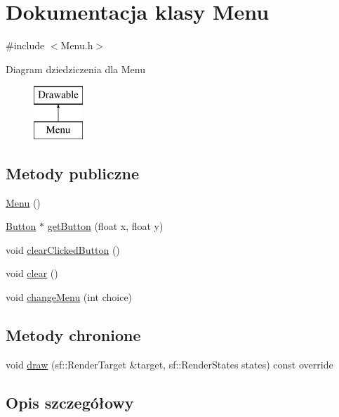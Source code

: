\hypertarget{class_menu}{}\section{Dokumentacja klasy Menu}
\label{class_menu}


{\ttfamily \#include $<$Menu.\+h$>$}

Diagram dziedziczenia dla Menu\begin{figure}[H]
\begin{center}
\leavevmode
\includegraphics[height=2.000000cm]{class_menu}
\end{center}
\end{figure}
\subsection*{Metody publiczne}
\begin{DoxyCompactItemize}
\item 
\mbox{\hyperlink{class_menu_ad466dd83355124a6ed958430450bfe94}{Menu}} ()
\item 
\mbox{\hyperlink{class_button}{Button}} $\ast$ \mbox{\hyperlink{class_menu_add20f283775e3cdb3ad8e8f8f02af83e}{get\+Button}} (float x, float y)
\item 
void \mbox{\hyperlink{class_menu_a6ebff4998eb64bad2871a658ab7ed3c0}{clear\+Clicked\+Button}} ()
\item 
void \mbox{\hyperlink{class_menu_a3630ce145aab68961ec535762d928558}{clear}} ()
\item 
void \mbox{\hyperlink{class_menu_a55609527292757ffa53fdfc6c2a23a38}{change\+Menu}} (int choice)
\end{DoxyCompactItemize}
\subsection*{Metody chronione}
\begin{DoxyCompactItemize}
\item 
void \mbox{\hyperlink{class_menu_a0a6873f5c605195a1f242c3f678df55e}{draw}} (sf\+::\+Render\+Target \&target, sf\+::\+Render\+States states) const override
\end{DoxyCompactItemize}


\subsection{Opis szczegółowy}


